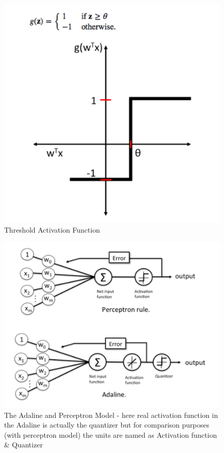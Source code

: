 \documentclass[conference]{IEEEtran}
\begin{document}
\begin{figure}[h!]
\centering
\includegraphics[scale=0.25]{threshold_activation}
\caption{Threshold Activation Function}
\label{threshold}
\end{figure}

\begin{figure}[h!]
\centering
\includegraphics[scale=0.5]{Adaline_Perceptron}
\caption{The Adaline and Perceptron Model - here real activation function in the Adaline is actually the quantizer but for comparison purposes (with perceptron model) the units are named as Activation function \& Quantizer }
\label{Adaline Perceptron}
\end{figure}
\end{document}
